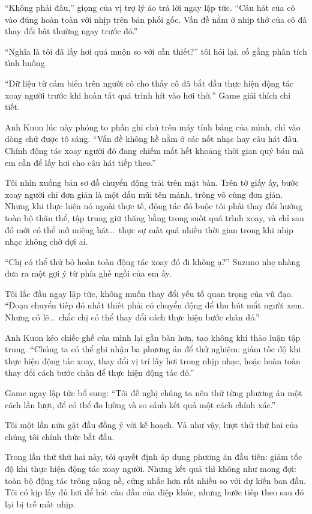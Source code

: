 ﻿\documentclass[../main.tex]{subfiles}
\begin{document}
``Không phải đâu,'' giọng của vị trợ lý ảo trả lời ngay lập tức. ``Câu hát của cô vào đúng hoàn toàn với nhịp trên bản phối gốc. Vấn đề nằm ở nhịp thở của cô đã thay đổi bất thường ngay trước đó.''

``Nghĩa là tôi đã lấy hơi quá muộn so với cần thiết?'' tôi hỏi lại, cố gắng phân tích tình huống.

``Dữ liệu từ cảm biến trên người cô cho thấy cô đã bắt đầu thực hiện động tác xoay người trước khi hoàn tất quá trình hít vào hơi thở,'' Game giải thích chi tiết.

Anh Kuon lúc này phóng to phần ghi chú trên máy tính bảng của mình, chỉ vào dòng chữ được tô sáng. ``Vấn đề không hề nằm ở các nốt nhạc hay câu hát đâu. Chính động tác xoay người đó đang chiếm mất hết khoảng thời gian quý báu mà em cần để lấy hơi cho câu hát tiếp theo.''

Tôi nhìn xuống bản sơ đồ chuyển động trải trên mặt bàn. Trên tờ giấy ấy, bước xoay người chỉ đơn giản là một dấu mũi tên mảnh, trông vô cùng đơn giản. Nhưng khi thực hiện nó ngoài thực tế, động tác đó buộc tôi phải thay đổi hướng toàn bộ thân thể, tập trung giữ thăng bằng trong suốt quá trình xoay, và chỉ sau đó mới có thể mở miệng hát\dots\ thực sự mất quá nhiều thời gian trong khi nhịp nhạc không chờ đợi ai.

``Chị có thể thử bỏ hoàn toàn động tác xoay đó đi không ạ?'' Suzuno nhẹ nhàng đưa ra một gợi ý từ phía ghế ngồi của em ấy.

Tôi lắc đầu ngay lập tức, không muốn thay đổi yếu tố quan trọng của vũ đạo. ``Đoạn chuyển tiếp đó nhất thiết phải có chuyển động để thu hút mắt người xem. Nhưng có lẽ\dots\ chắc chị có thể thay đổi cách thực hiện bước chân đó.''

Anh Kuon kéo chiếc ghế của mình lại gần bàn hơn, tạo không khí thảo luận tập trung. ``Chúng ta có thể ghi nhận ba phương án để thử nghiệm: giảm tốc độ khi thực hiện động tác xoay, thay đổi vị trí lấy hơi trong nhịp nhạc, hoặc hoàn toàn thay đổi cách bước chân để thực hiện động tác đó.''

Game ngay lập tức bổ sung: ``Tôi đề nghị chúng ta nên thử từng phương án một cách lần lượt, để có thể đo lường và so sánh kết quả một cách chính xác.''

Tôi một lần nữa gật đầu đồng ý với kế hoạch. Và như vậy, lượt thử thứ hai của chúng tôi chính thức bắt đầu.

\ct

Trong lần thử thứ hai này, tôi quyết định áp dụng phương án đầu tiên: giảm tốc độ khi thực hiện động tác xoay người. Nhưng kết quả thì không như mong đợi: toàn bộ động tác trông nặng nề, cứng nhắc hơn rất nhiều so với dự kiến ban đầu. Tôi có kịp lấy đủ hơi để hát câu đầu của điệp khúc, nhưng bước tiếp theo sau đó lại bị trễ mất nhịp.
\end{document}

